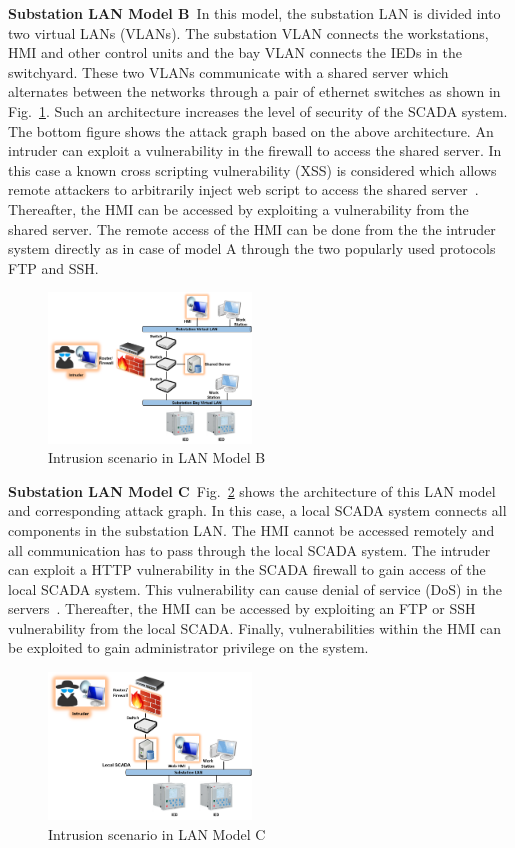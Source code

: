 \noindent\textbf{Substation LAN Model B}\ 
In this model, the substation LAN is divided into two virtual LANs (VLANs). The substation VLAN connects the workstations, HMI and other control units and the bay VLAN connects the IEDs in the switchyard. These two VLANs communicate with a shared server which alternates between the networks through a pair of ethernet switches as shown in Fig.~\ref{fig:model-B}. Such an architecture increases the level of security of the SCADA system. The bottom figure shows the attack graph based on the above architecture. An intruder can exploit a vulnerability in the firewall to access the shared server. In this case a known cross scripting vulnerability (XSS) is considered which allows remote attackers to arbitrarily inject web script to access the shared server~\cite{ftp}. Thereafter, the HMI can be accessed by exploiting a vulnerability from the shared server. The remote access of the HMI can be done from the the intruder system directly  as in case of model A through the two popularly used protocols FTP and SSH.
\begin{figure}[htbp]
	\includegraphics[width=0.48\textwidth]{B-model.png}
	\caption{Intrusion scenario in LAN Model B}\label{fig:model-B}
\end{figure}

\noindent\textbf{Substation LAN Model C}\ 
Fig.~\ref{fig:model-C} shows the architecture of this LAN model and corresponding attack graph. In this case, a local SCADA system connects all components in the substation LAN. The HMI cannot be accessed remotely and all communication has to pass through the local SCADA system. The intruder can exploit a HTTP vulnerability in the SCADA firewall to gain access of the local SCADA system. This vulnerability can cause denial of service (DoS) in the servers~\cite{http}. Thereafter, the HMI can be accessed by exploiting an FTP or SSH vulnerability from the local SCADA. Finally, vulnerabilities within the HMI can be exploited to gain administrator privilege on the system.
\begin{figure}[htbp]
	\includegraphics[width=0.48\textwidth]{C-model.png}
	\caption{Intrusion scenario in LAN Model C}\label{fig:model-C}
\end{figure}

